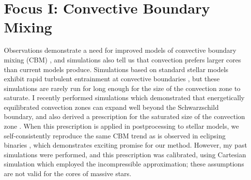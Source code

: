 \documentclass[11pt]{amsart} %
\theoremstyle{definition}
\numberwithin{equation}{section}
\begin{document}
\newpage
\section{Focus I: Convective Boundary Mixing}




Observations demonstrate a need for improved models of convective boundary mixing (CBM) \citep{johnston2021}, and simulations also tell us that convection prefers larger cores than current models produce.
Simulations based on standard stellar models exhibit rapid turbulent entrainment at convective boundaries \citep{rizzuti_etal_2022}, but these simulations are rarely run for long enough for the size of the convection zone to saturate.
I recently performed simulations which demonstrated that energetically equilibrated convection zones can expand well beyond the Schwarzschild boundary, and also derived a prescription for the saturated size of the convection zone \citep[see Fig.~\ref{fig:cbm}, left;][]{anders_etal_2022a}.
When this prescription is applied in postprocessing to stellar models, we self-consistently reproduce the same CBM trend as is observed in eclipsing binaries \citep[see Fig.~\ref{fig:cbm}, middle;][]{jermyn_etal_2022_penconv}, which demonstrates exciting promise for our method.
However, my past simulations were performed, and this prescription was calibrated, using Cartesian simulation which employed the incompressible approximation; these assumptions are not valid for the cores of massive stars.
\end{document}

